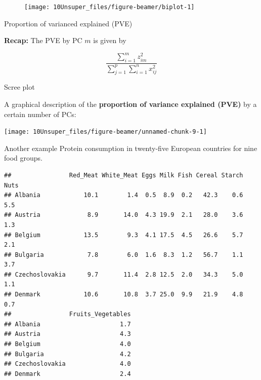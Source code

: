 \documentclass[
  10pt,
  ignorenonframetext,
]{beamer}
\begin{document}
\begin{frame}
\begin{figure}
\texttt{[image: 10Unsuper\_files/figure-beamer/biplot-1]} \end{figure}
\end{frame}

\begin{frame}
\begin{block}{Proportion of varianced explained (PVE)}
\label{proportion-of-varianced-explained-pve}
\(~\)

\textbf{Recap:} The PVE by PC \(m\) is given by

\[
\frac{\sum_{i=1}^m z_{im}^2} {\sum_{j=1}^p\sum_{i=1}^n x_{ij}^2}
\]
\end{block}
\end{frame}

\begin{frame}
\begin{block}{Scree plot}
\label{scree-plot}
\(~\)

A graphical description of the \textbf{proportion of variance explained
(PVE)} by a certain number of PCs:

\centering

\texttt{[image: 10Unsuper\_files/figure-beamer/unnamed-chunk-9-1]}
\end{block}
\end{frame}

\begin{frame}[fragile]{Another example}
\label{another-example}
Protein consumption in twenty-five European countries for nine food
groups.

\begin{verbatim}
##                Red_Meat White_Meat Eggs Milk Fish Cereal Starch Nuts
## Albania            10.1        1.4  0.5  8.9  0.2   42.3    0.6  5.5
## Austria             8.9       14.0  4.3 19.9  2.1   28.0    3.6  1.3
## Belgium            13.5        9.3  4.1 17.5  4.5   26.6    5.7  2.1
## Bulgaria            7.8        6.0  1.6  8.3  1.2   56.7    1.1  3.7
## Czechoslovakia      9.7       11.4  2.8 12.5  2.0   34.3    5.0  1.1
## Denmark            10.6       10.8  3.7 25.0  9.9   21.9    4.8  0.7
##                Fruits_Vegetables
## Albania                      1.7
## Austria                      4.3
## Belgium                      4.0
## Bulgaria                     4.2
## Czechoslovakia               4.0
## Denmark                      2.4
\end{verbatim}
\end{frame}
\end{document}
